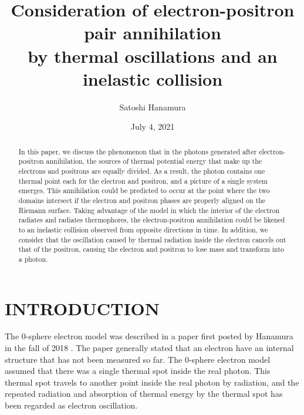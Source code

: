 \documentclass[%
 reprint,
 amsmath,amssymb,
 aps,
]{revtex4-1}
\numberwithin{equation}{section}%
\begin{document}

    \title{Consideration of electron-positron pair annihilation \\ by thermal oscillations and an inelastic collision}
    \author{Satoshi Hanamura}
    \date{July 4, 2021}
        \begin{abstract}


In this paper, we discuss the phenomenon that in the photons generated after electron-positron annihilation, the sources of thermal potential energy that make up the electrons and positrons are equally divided. As a result, the photon contains one thermal point each for the electron and positron, and a picture of a single system emerges. This annihilation could be predicted to occur at the point where the two domains intersect if the electron and positron phases are properly aligned on the Riemann surface. Taking advantage of the model in which the interior of the electron radiates and radiates thermophores, the electron-positron annihilation could be likened to an inelastic collision observed from opposite directions in time. In addition, we consider that the oscillation caused by thermal radiation inside the electron cancels out that of the positron, causing the electron and positron to lose mass and transform into a photon.


        \end{abstract}
    \maketitle


\section{\label{sec:INTRODUCTION}INTRODUCTION}


The 0-sphere electron model was described in a paper first posted by Hanamura in the fall of 2018 \cite{Hanamura1} \cite{Hanamura2}. The paper generally stated that an electron have an internal structure that has not been measured so far. The 0-sphere electron model assumed that there was a single thermal spot inside the real photon. This thermal spot travels to another point inside the real photon by radiation, and the repeated radiation and absorption of thermal energy by the thermal spot has been regarded as electron oscillation.
\end{document}
